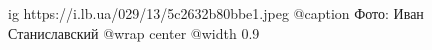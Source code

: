  
 
 
 
 

\ifcmt
  ig https://i.lb.ua/029/13/5c2632b80bbe1.jpeg
	@caption Фото: Иван Станиславский
  @wrap center
  @width 0.9
\fi
